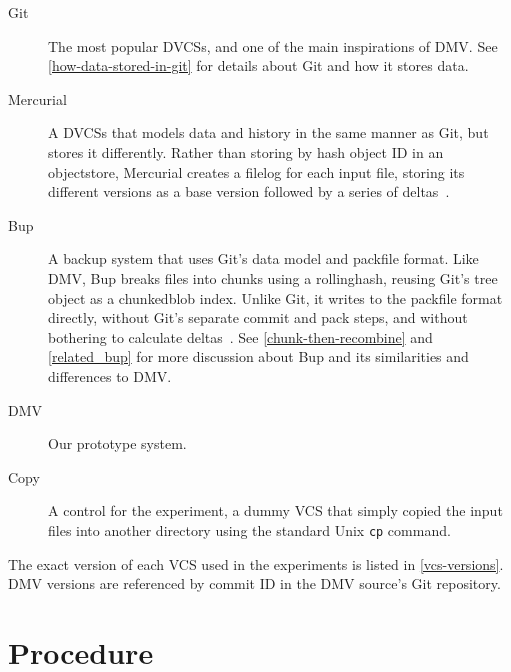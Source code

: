 \begin{description}

    \item[Git] The most popular \glspl{DVCS}, and one of the main inspirations
        of \gls{DMV}. See \autoref{how-data-stored-in-git} for details about Git
        and how it stores data.

    \item[Mercurial] A \glspl{DVCS} that models data and history in the same
        manner as Git, but stores it differently. Rather than storing by hash
        object ID in an \gls{objectstore}, Mercurial creates a \gls{filelog} for
        each input file, storing its different versions as a base version
        followed by a series of deltas~\cite[Chapter 4]{hgbook}.

    \item[Bup] A backup system that uses Git's data model and \gls{packfile}
        format. Like DMV, Bup breaks files into chunks using a
        \gls{rollinghash}, reusing Git's \gls{tree} object as a
        \gls{chunkedblob} index\footnotemark. Unlike Git, it writes to the
        \gls{packfile} format directly, without Git's separate commit and pack
        steps, and without bothering to calculate deltas~\cite{bup_design}. See
        \autoref{chunk-then-recombine} and \autoref{related_bup} for more
        discussion about Bup and its similarities and differences to DMV.


    \item[DMV] Our prototype system.

    \item[Copy] A control for the experiment, a dummy \gls{VCS} that simply
        copied the input files into another directory using the standard Unix
        \lstinline{cp} command.

\end{description}

The exact version of each \gls{VCS} used in the experiments is listed in
\autoref{vcs-versions}. \gls{DMV} versions are referenced by commit ID in the
\gls{DMV} source's Git \gls{repository}.

%



\section{Procedure}

